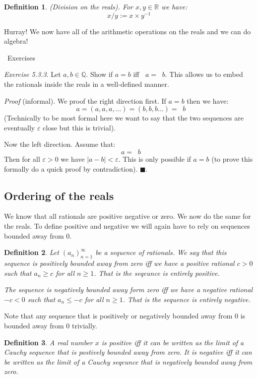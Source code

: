 \documentclass{article}
\newtheorem{definition}{Definition}[subsection]
\newcommand{\R}{\mathbb{R}}
\newcommand{\Q}{\mathbb{Q}}
\newcommand{\exercisesline}{	%
    \begin{center}
    \textemdash\ Exercises\ \textemdash
    \end{center}
}
\newcommand{\vep}{\varepsilon} %
\DeclareMathOperator{\infLIM}{\mathrm{LIM}_{n \to \infty}}
\let\it\textit
\begin{document}
\begin{definition}
	(Division on the reals). For $x,y \in \R$ we have:
	$$
	x/y := x\times y^{-1}
	$$
\end{definition}

Hurray! We now have all of the arithmetic operations 
on the reals and we can do algebra!

\exercisesline

\it{Exercise 5.3.3}. Let $a,b \in \Q$. Show if $a=b$ 
iff $\infLIM a = \infLIM b$. This allows us to 
embed the rationals inside the reals in a well-defined 
manner. 

\it{Proof} (informal). We proof the right direction 
first. If $a=b$ then we have: 
$$
\infLIM a = (a,a,a, \dots) = (b,b,b \dots) = \infLIM b
$$
(Technically to be most formal here we want to say that 
the two sequences are eventually $\vep$ close but this is
trivial). 

Now the left direction. Assume that:
$$
\infLIM a = \infLIM b 
$$
Then for all $\vep > 0$ we have $|a-b| < \vep$. This 
is only possible if $a = b$ (to prove this formally 
do a quick proof by contradiction). \hfill $\blacksquare$.



\subsection{Ordering of the reals}

We know that all rationals are positive negative or zero. 
We now do the same for the reals. To define positive and 
negative we will again have to rely on sequences bounded 
away from $0$.

\begin{definition}
	Let $(a_n)_{n=1}^\infty$ be a sequence of rationals.
	We say that this sequence is positively 
	bounded away from zero iff 
	we have a positive rational $c > 0$ such
	that $a_n \geq c$ for all $n\geq 1$.
	That is the seqeunce is entirely positive.

	The sequence is negatively bounded 
	away form zero iff we have 
	a negative rational $-c < 0$ such 
	that $a_n \leq -c$ for all $n \geq 1$.
	That is the sequence is entirely negative.
\end{definition}

Note that any sequence that is positively or 
negatively bounded away from $0$ is bounded 
away from $0$ trivially.

\begin{definition}
	A real number $x$ is positive 
	iff it can be written 
	as the limit of a Cauchy sequence
	that is postively bounded 
	away from zero. It is 
	negative iff it can be written 
	as the limit of a Cauchy seqeunce that 
	is negatively bounded 
	away from zero.
\end{definition}
\end{document}
